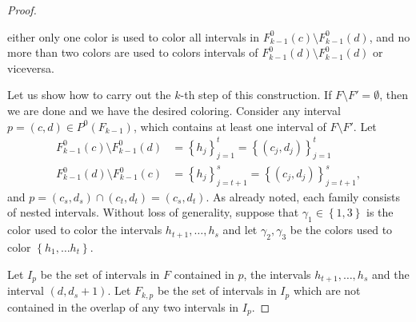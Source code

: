 \documentclass{article}
\theoremstyle{definition}
\begin{document}
\begin{proof}
\begin{enumerate}
                either only one
                color is used to color
                all intervals in 
                $F^{0}_{k-1}\left(c\right) 
                \setminus F^{0}_{k-1}\left(d\right)$,
                and no more than 
                two colors are used to 
                colors intervals
                of $F^{0}_{k-1}\left(d\right)
                \setminus F^{0}_{k-1}\left(d\right)$
                or viceversa.
        \end{enumerate}
        Let us show how to carry out the 
        $k$-th step of this construction.
        If $F \setminus F' = \emptyset$,
        then we are done and we have 
        the desired coloring.
        Consider any interval
        $p = \left(c, d\right)
        \in P^{0}\left(F_{k-1}\right)$,
        which contains at least one interval
        of $F \setminus F'$. 
        Let
        \begin{align*}
            F^{0}_{k-1}\left(c\right) \setminus 
            F^{0}_{k-1}\left(d\right)
            &= \left\{h_{j}\right\}_{j=1}^{t}
            = \left\{\left(c_{j},
            d_{j}\right)\right\}_{j=1}^{t} \\
            F^{0}_{k-1}\left(d\right) \setminus 
            F^{0}_{k-1} \left(c\right)
            &= \left\{h_{j}\right\}_{j=t+1}^{s}
            = \left\{\left(c_{j},
            d_{j}\right)\right\}_{j=t+1}^{s},
        \end{align*}
        and $p = \left(c_{s}, d_{s}\right)
        \cap \left(c_{t}, d_{t}\right) = 
        \left(c_{s}, d_{t}\right)$.
        As already noted, each
        family consists of
        nested intervals.
        Without loss of generality,
        suppose that
        $\gamma_1 \in \left\{1, 3\right\}$
        is the color used to
        color the intervals
        $h_{t+1}, \ldots, h_{s}$
        and let $\gamma_{2}, \gamma_{3}$
        be the colors used to 
        color
        $\left\{h_1, \ldots h_t\right\}$.
        
        Let $I_{p}$ be the
        set of intervals in $F$ 
        contained in $p$,
        the intervals $h_{t+1},
        \ldots, h_{s}$ and the 
        interval 
        $\left(d, d_{s} + 1\right)$.
        Let $F_{k, p}$ be 
        the set of intervals in $I_{p}$ 
        which are not contained in
        the overlap of any two
        intervals in $I_{p}$. 


\end{proof}
\end{document}
